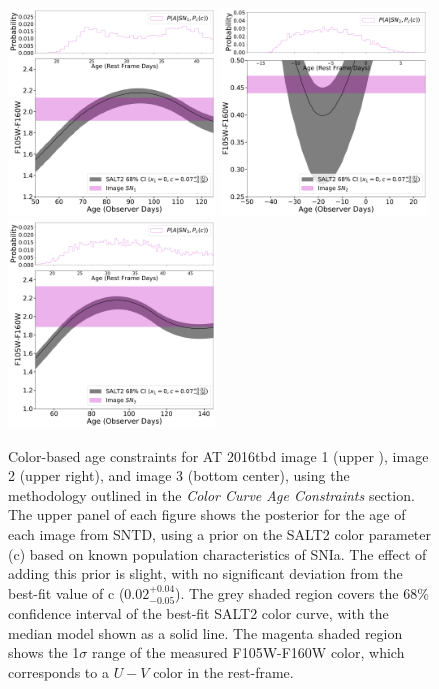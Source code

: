 \documentclass[12pt]{article}
\def\SNABC{AT 2016tbd\xspace}
\begin{document}
\begin{figure}
    \centering
    \includegraphics[width=0.49\textwidth]{Paper/Figures/colorcurve_image1.pdf}
    \includegraphics[width=0.49\textwidth]{Paper/Figures/colorcurve_image2.pdf}
    \includegraphics[width=0.49\textwidth]{Paper/Figures/colorcurve_image3.pdf}
    \caption{Color-based age constraints for \SNABC image 1 (upper ), image 2 (upper right), and image 3 (bottom center), using the methodology outlined in the \textit{Color Curve Age Constraints} section. The upper panel of each figure shows the posterior for the age of each image from SNTD, using a prior on the SALT2 color parameter (c) based on known population characteristics of SNIa. The effect of adding this prior is slight, with no significant deviation from the best-fit value of c ($0.02^{+0.04}_{-0.05}$). The grey shaded region covers the 68\% confidence interval of the best-fit SALT2 color curve, with the median model shown as a solid line. The magenta shaded region shows the 1$\sigma$ range of the measured F105W-F160W color, which corresponds to a $U-V$ color in the rest-frame.}
    \label{fig:colorcurves}
\end{figure}
\end{document}
